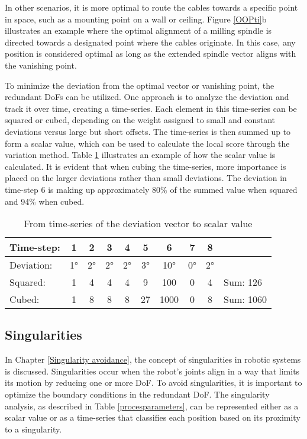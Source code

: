\documentclass[conference]{IEEEtran}
\begin{document}
In other scenarios, it is more optimal to route the cables towards a specific point in space, such as a mounting point on a wall or ceiling. Figure \ref{OOPti}b illustrates an example where the optimal alignment of a milling spindle is directed towards a designated point where the cables originate. In this case, any position is considered optimal as long as the extended spindle vector aligns with the vanishing point.





To minimize the deviation from the optimal vector or vanishing point, the redundant DoFs can be utilized. One approach is to analyze the deviation and track it over time, creating a time-series. Each element in this time-series can be squared or cubed, depending on the weight assigned to small and constant deviations versus large but short offsets. The time-series is then summed up to form a scalar value, which can be used to calculate the local score through the variation method. Table \ref{deviation} illustrates an example of how the scalar value is calculated. It is evident that when cubing the time-series, more importance is placed on the larger deviations rather than small deviations. The deviation in time-step 6 is making up approximately 80\% of the summed value when squared and 94\% when cubed. 


\begin{table}[H]
\centering
\caption{From time-series of the deviation vector to scalar value}
\begin{tabular}{||l|c|c|c|c|c|c|c|c|l||}
	\hline
	Time-step:  & 1 & 2& 3& 4& 5& 6& 7& 8&  \\
	\hline
	Deviation:  & 1° & 2°& 2°& 2°& 3°& 10°& 0°& 2°&  \\
	\hline
	\hline
	Squared:  & 1 & 4& 4& 4& 9& 100& 0& 4& Sum: 126  \\
	Cubed:  & 1 & 8& 8& 8& 27& 1000& 0& 8& Sum: 1060  \\
	\hline
	\hline
	
\end{tabular}


\label{deviation}
\end{table}



\subsection{Singularities}

In Chapter \ref{Singularity avoidance}, the concept of singularities in robotic systems is discussed. Singularities occur when the robot's joints align in a way that limits its motion by reducing one or more DoF. To avoid singularities, it is important to optimize the boundary conditions in the redundant DoF. The singularity analysis, as described in Table \ref{procesparameters}, can be represented either as a scalar value or as a time-series that classifies each position based on its proximity to a singularity.
\end{document}
